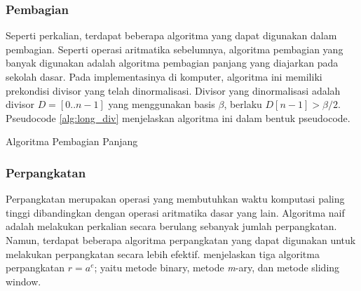     \subsubsection{Pembagian}\label{sec:div_theory}

      Seperti perkalian, terdapat beberapa algoritma yang dapat digunakan dalam pembagian. Seperti operasi aritmatika sebelumnya, algoritma pembagian yang banyak digunakan adalah algoritma pembagian panjang yang diajarkan pada sekolah dasar. Pada implementasinya di komputer, algoritma ini memiliki prekondisi divisor yang telah dinormalisasi. Divisor yang dinormalisasi adalah divisor $D = [0..n-1]$ yang menggunakan basis $\beta$, berlaku $D[n-1] > \beta/2$. Pseudocode \ref{alg:long_div} menjelaskan algoritma ini dalam bentuk pseudocode.

      \begin{algorithm}
        \caption{Algoritma Pembagian Panjang}
        \label{alg:long_div}
        \begin{algorithmic}[1]
          \Statex
              \Else
              \EndIf
                  \EndWhile
              \EndFor
              \State {}
          \EndFunction
        \end{algorithmic}

      \end{algorithm}

    \subsubsection{Perpangkatan}
        Perpangkatan merupakan operasi yang membutuhkan waktu komputasi paling tinggi dibandingkan dengan operasi aritmatika dasar yang lain. Algoritma naif adalah melakukan perkalian secara berulang sebanyak jumlah perpangkatan. Namun, terdapat beberapa algoritma perpangkatan yang dapat digunakan untuk melakukan perpangkatan secara lebih efektif.
        \citet{exp_method} menjelaskan tiga algoritma perpangkatan $r=a^e$; yaitu metode binary, metode \textit{m}-ary, dan metode sliding window.

